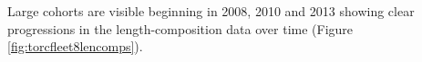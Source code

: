 \documentclass[11pt,
  english,
  a4paper,
]{article}
\begin{document}

Large cohorts are visible beginning in 2008, 2010 and 2013 showing clear progressions in the length-composition data over time (Figure \ref{fig:torcfleet8lencomps}).

\end{document}
